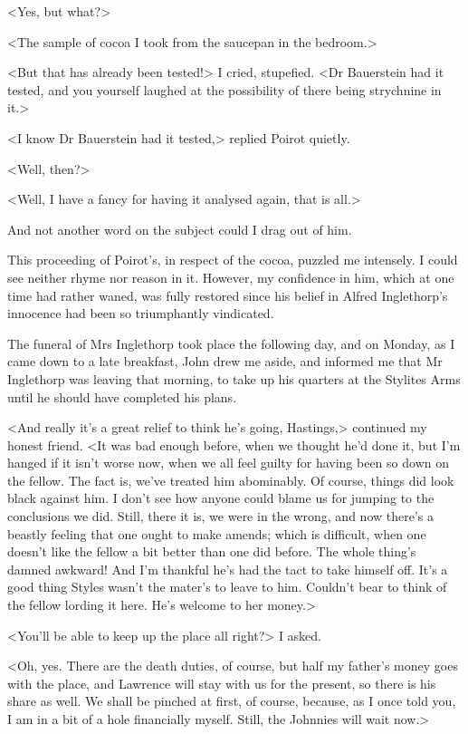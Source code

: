  <Yes, but what?> 

 <The sample of cocoa I took from the saucepan in the bedroom.> 

 <But that has already been tested!> I cried, stupefied. <Dr Bauerstein had it tested, and you yourself laughed at the possibility of there being strychnine in it.> 

 <I know Dr Bauerstein had it tested,> replied Poirot quietly. 

 <Well, then?> 

 <Well, I have a fancy for having it analysed again, that is all.> 

 And not another word on the subject could I drag out of him. 

 This proceeding of Poirot's, in respect of the cocoa, puzzled me intensely. I could see neither rhyme nor reason in it. However, my confidence in him, which at one time had rather waned, was fully restored since his belief in Alfred Inglethorp's innocence had been so triumphantly vindicated. 

 The funeral of Mrs Inglethorp took place the following day, and on Monday, as I came down to a late breakfast, John drew me aside, and informed me that Mr Inglethorp was leaving that morning, to take up his quarters at the Stylites Arms until he should have completed his plans. 

 <And really it's a great relief to think he's going, Hastings,> continued my honest friend. <It was bad enough before, when we thought he'd done it, but I'm hanged if it isn't worse now, when we all feel guilty for having been so down on the fellow. The fact is, we've treated him abominably. Of course, things did look black against him. I don't see how anyone could blame us for jumping to the conclusions we did. Still, there it is, we were in the wrong, and now there's a beastly feeling that one ought to make amends; which is difficult, when one doesn't like the fellow a bit better than one did before. The whole thing's damned awkward! And I'm thankful he's had the tact to take himself off. It's a good thing Styles wasn't the mater's to leave to him. Couldn't bear to think of the fellow lording it here. He's welcome to her money.> 

 <You'll be able to keep up the place all right?> I asked. 

 <Oh, yes. There are the death duties, of course, but half my father's money goes with the place, and Lawrence will stay with us for the present, so there is his share as well. We shall be pinched at first, of course, because, as I once told you, I am in a bit of a hole financially myself. Still, the Johnnies will wait now.> 

